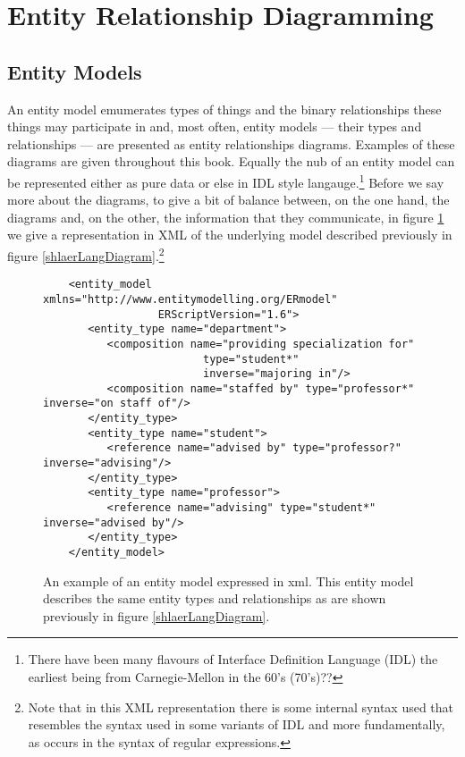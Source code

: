 \section{Entity Relationship Diagramming}
\label{EntityRelationshipDiagramming}

\subsection{Entity Models}

\mynote
An entity model emumerates types of things and the binary relationships these things may participate in and,
most often, entity models --- their types and relationships --- are presented as entity relationships diagrams.
Examples of these diagrams are given  throughout this book.  
Equally the nub of an entity model can be represented either as pure data 
or else in IDL style langauge.\footnote{There have been many flavours of Interface Definition Language (IDL) the earliest being from Carnegie-Mellon in the 60's (70's)??} 
Before we say more about the diagrams, to give a bit of balance between, on the one hand, the diagrams and,
on the other, the information that they communicate, in figure \ref{shlaerlangModel} we give a representation in XML of the underlying model described previously in figure \ref{shlaerLangDiagram}.\footnote{Note that in this XML representation there is some internal syntax used that resembles the syntax used in some variants of IDL and more fundamentally, as occurs in the syntax of regular expressions.} 

\begin{figure}[h] %
\footnotesize\begin{verbatim}
	<entity_model xmlns="http://www.entitymodelling.org/ERmodel" 
	              ERScriptVersion="1.6">
	   <entity_type name="department">
	      <composition name="providing specialization for"
	                     type="student*"
	                     inverse="majoring in"/>
	      <composition name="staffed by" type="professor*" inverse="on staff of"/>
	   </entity_type>
	   <entity_type name="student">
	      <reference name="advised by" type="professor?" inverse="advising"/>
	   </entity_type>
	   <entity_type name="professor">
	      <reference name="advising" type="student*" inverse="advised by"/>
	   </entity_type>
	</entity_model>\end{verbatim}
\caption{An example of an entity model expressed in xml. 
This entity model describes the same entity types and relationships 
as are shown previously in figure \ref{shlaerLangDiagram}. }
\label{shlaerlangModel}
\end{figure}


